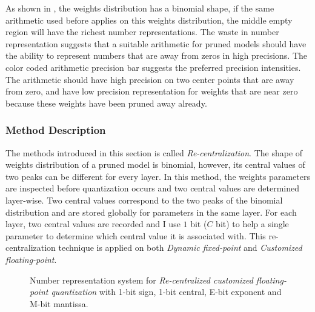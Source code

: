 \documentclass[a4paper,12pt]{report}
\begin{document}
As shown in , the weights distribution has a binomial shape,
if the same arithmetic used before applies on this weights distribution,
the middle empty region will have the richest number representations.
The waste in number representation suggests that a suitable arithmetic for
pruned models should have the
ability to represent numbers that are away from zeros in high precisions.
The color coded arithmetic precision bar suggests the preferred precision
intensities.
The arithmetic should have high precision on two center points that are away
from zero, and have low precision representation for weights that are near zero
because these weights have been pruned away already.

\subsubsection{Method Description}
The methods introduced in this section is called \textit{Re-centralization}.
The shape of weights distribution of a pruned model is binomial, however, its
central values of two peaks can be different for every layer.
In this method, the weights parameters are inspected before quantization occurs and
two central values are determined layer-wise.
Two central values correspond to the two peaks of the binomial distribution
and are stored globally for parameters in the same layer.
For each layer, two central values are recorded and I use $1$ bit ($C$ bit) to
help a single parameter to determine which central value it is associated with.
This re-centralization technique is applied on both \textit{Dynamic fixed-point}
and \textit{Customized floating-point}.

\begin{figure}[!h]
\centering
{}
\caption{Number representation system for \textit{Re-centralized customized floating-point quantization} with
1-bit sign, 1-bit central, E-bit exponent and M-bit mantissa.}
\label{fig:number_rep_ccfp}
\end{figure}
\end{document}
